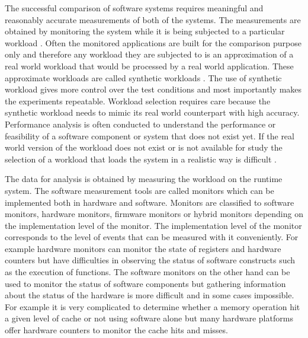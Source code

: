 The successful comparison of software systems requires meaningful and reasonably
accurate measurements of both of the systems. The measurements are obtained by
monitoring the system while it is being subjected to a particular workload
\cite{jain1991art}. Often the monitored applications are built for the comparison
purpose only and therefore any workload they are subjected to is an
approximation of a real world workload that would be processed by a real world
application. These approximate workloads are called synthetic workloads
\cite{jain1991art}. The use of synthetic workload gives more control over the
test conditions and most importantly makes the experiments repeatable. Workload
selection requires care because the synthetic workload needs to mimic its real
world counterpart with high accuracy. Performance analysis is often conducted to
understand the performance or feasibility of a software component or system
that does not exist yet. If the real world version of the workload does not
exist or is not available for study the selection of a workload that loads the
system in a realistic way is difficult \cite{jain1991art}.


The data for analysis is obtained by measuring the workload on the runtime
system. The software measurement tools are called monitors which can be
implemented both in hardware and software. Monitors are classified to software
monitors, hardware monitors, firmware monitors or hybrid monitors depending on
the implementation level of the monitor. The implementation level of the monitor
corresponds to the level of events that can be measured with it conveniently.
For example hardware monitors can monitor the state of registers and hardware
counters but have difficulties in observing the status of software constructs
such as the execution of functions. The software monitors on the other hand can
be used to monitor the status of software components but gathering information
about the status of the hardware is more difficult and in some cases impossible.
\cite{jain1991art} For example it is very complicated to determine whether a
memory operation hit a given level of cache or not using software alone but many
hardware platforms offer hardware counters to monitor the cache hits and misses.


